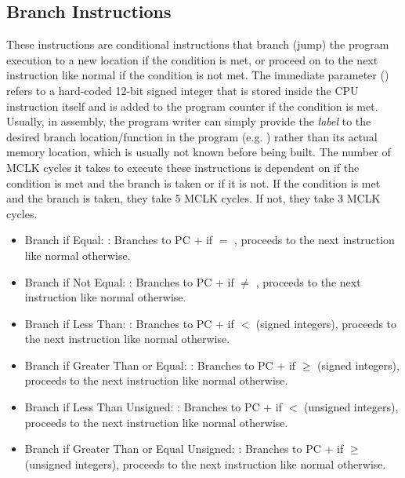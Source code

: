 \documentclass[11pt,pdftex,portrait,letterpaper]{article}
\begin{document}
\subsection{Branch Instructions}

These instructions are conditional instructions that branch (jump) the program execution to a new location if the condition is met, or proceed on to the next instruction like normal if the condition is not met. The immediate parameter () refers to a hard-coded 12-bit signed integer that is stored inside the CPU instruction itself and is added to the program counter if the condition is met. Usually, in assembly, the program writer can simply provide the \textit{label} to the desired branch location/function in the program (e.g. ) rather than its actual memory location, which is usually not known before being built. The number of MCLK cycles it takes to execute these instructions is dependent on if the condition is met and the branch is taken or if it is not. If the condition is met and the branch is taken, they take 5 MCLK cycles. If not, they take 3 MCLK cycles.

\begin{itemize}
	\item Branch if Equal: : Branches to PC +  if  $=$ , proceeds to the next instruction like normal otherwise.
	\item Branch if Not Equal: : Branches to PC +  if  $\neq$ , proceeds to the next instruction like normal otherwise.
	\item Branch if Less Than: : Branches to PC +  if  $<$  (signed integers), proceeds to the next instruction like normal otherwise.
	\item Branch if Greater Than or Equal: : Branches to PC +  if  $\geq$  (signed integers), proceeds to the next instruction like normal otherwise.
	\item Branch if Less Than Unsigned: : Branches to PC +  if  $<$  (unsigned integers), proceeds to the next instruction like normal otherwise.
	\item Branch if Greater Than or Equal Unsigned: : Branches to PC +  if  $\geq$  (unsigned integers), proceeds to the next instruction like normal otherwise.
\end{itemize}
\end{document}
